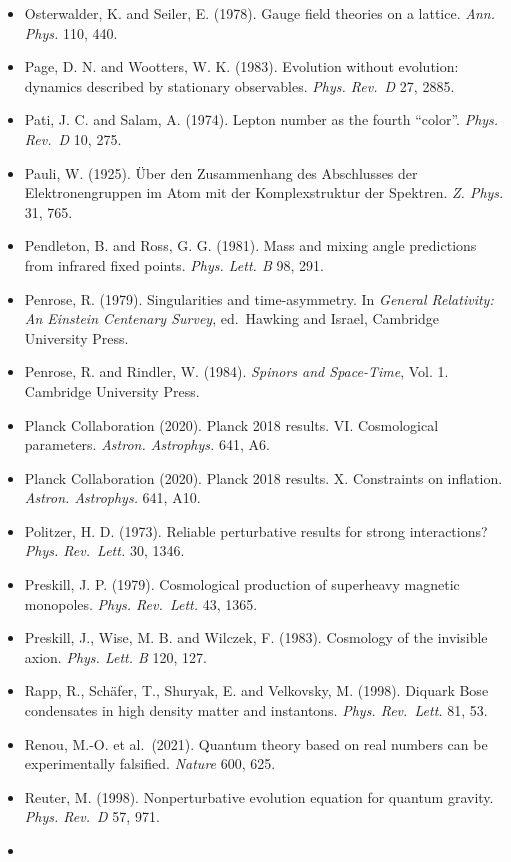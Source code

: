 \documentclass[
  11pt,
]{article}
\begin{document}
\begin{itemize}
\item
  Osterwalder, K. and Seiler, E. (1978). Gauge field theories on a lattice. \emph{Ann. Phys.} 110, 440.
\item
  Page, D. N. and Wootters, W. K. (1983). Evolution without evolution: dynamics described by stationary observables. \emph{Phys. Rev.~D} 27, 2885.
\item
  Pati, J. C. and Salam, A. (1974). Lepton number as the fourth ``color''. \emph{Phys. Rev.~D} 10, 275.
\item
  Pauli, W. (1925). Über den Zusammenhang des Abschlusses der Elektronengruppen im Atom mit der Komplexstruktur der Spektren. \emph{Z. Phys.} 31, 765.
\item
  Pendleton, B. and Ross, G. G. (1981). Mass and mixing angle predictions from infrared fixed points. \emph{Phys. Lett. B} 98, 291.
\item
  Penrose, R. (1979). Singularities and time-asymmetry. In \emph{General Relativity: An Einstein Centenary Survey}, ed.~Hawking and Israel, Cambridge University Press.
\item
  Penrose, R. and Rindler, W. (1984). \emph{Spinors and Space-Time}, Vol. 1. Cambridge University Press.
\item
  Planck Collaboration (2020). Planck 2018 results. VI. Cosmological parameters. \emph{Astron. Astrophys.} 641, A6.
\item
  Planck Collaboration (2020). Planck 2018 results. X. Constraints on inflation. \emph{Astron. Astrophys.} 641, A10.
\item
  Politzer, H. D. (1973). Reliable perturbative results for strong interactions? \emph{Phys. Rev.~Lett.} 30, 1346.
\item
  Preskill, J. P. (1979). Cosmological production of superheavy magnetic monopoles. \emph{Phys. Rev.~Lett.} 43, 1365.
\item
  Preskill, J., Wise, M. B. and Wilczek, F. (1983). Cosmology of the invisible axion. \emph{Phys. Lett. B} 120, 127.
\item
  Rapp, R., Schäfer, T., Shuryak, E. and Velkovsky, M. (1998). Diquark Bose condensates in high density matter and instantons. \emph{Phys. Rev.~Lett.} 81, 53.
\item
  Renou, M.-O. et al.~(2021). Quantum theory based on real numbers can be experimentally falsified. \emph{Nature} 600, 625.
\item
  Reuter, M. (1998). Nonperturbative evolution equation for quantum gravity. \emph{Phys. Rev.~D} 57, 971.
\item

\end{itemize}
\end{document}
